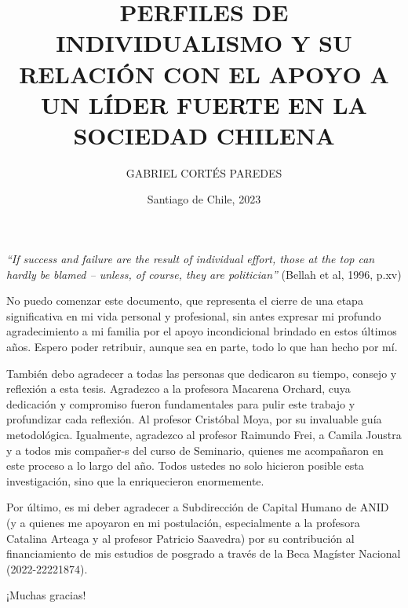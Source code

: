 \documentclass[12pt,twoside]{templates/facsothesis}
\title{PERFILES DE INDIVIDUALISMO Y SU RELACIÓN CON EL APOYO A UN LÍDER FUERTE EN LA SOCIEDAD CHILENA}
\author{GABRIEL CORTÉS PAREDES}
\date{Santiago de Chile, 2023}
\begin{document}
\raggedbottom

  \maketitle

\frontmatter %
 \pagestyle{empty} 

  \begin{prefacio}
  \thispagestyle{empty}
    \emph{``If success and failure are the result of individual effort, those at the top can hardly be blamed -- unless, of course, they are politician''} (Bellah et al, 1996, p.xv)
  \end{prefacio}

  \begin{agradecimientos}
  \thispagestyle{empty}
  \setlength\parskip{1em plus 0.1em minus 0.2em}
    No puedo comenzar este documento, que representa el cierre de una etapa significativa en mi vida personal y profesional, sin antes expresar mi profundo agradecimiento a mi familia por el apoyo incondicional brindado en estos últimos años. Espero poder retribuir, aunque sea en parte, todo lo que han hecho por mí.

    También debo agradecer a todas las personas que dedicaron su tiempo, consejo y reflexión a esta tesis. Agradezco a la profesora Macarena Orchard, cuya dedicación y compromiso fueron fundamentales para pulir este trabajo y profundizar cada reflexión. Al profesor Cristóbal Moya, por su invaluable guía metodológica. Igualmente, agradezco al profesor Raimundo Frei, a Camila Joustra y a todos mis compañer-s del curso de Seminario, quienes me acompañaron en este proceso a lo largo del año. Todos ustedes no solo hicieron posible esta investigación, sino que la enriquecieron enormemente.

    Por último, es mi deber agradecer a Subdirección de Capital Humano de ANID (y a quienes me apoyaron en mi postulación, especialmente a la profesora Catalina Arteaga y al profesor Patricio Saavedra) por su contribución al financiamiento de mis estudios de posgrado a través de la Beca Magíster Nacional (2022-22221874).

    ¡Muchas gracias!
  \end{agradecimientos}
\end{document}
